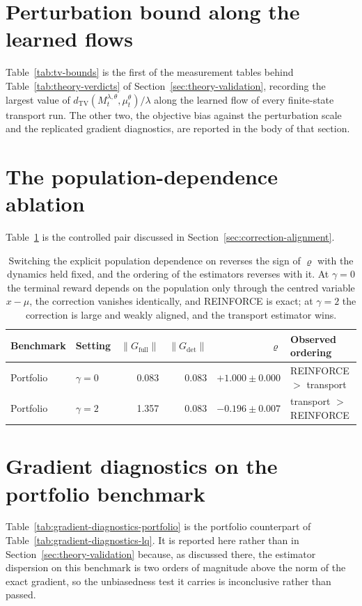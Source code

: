 

\section{Perturbation bound along the learned flows}
\label{appendix:theory-tables}
\label{appendix:tv-bounds}

Table~\ref{tab:tv-bounds} is the first of the measurement tables behind Table~\ref{tab:theory-verdicts} of Section~\ref{sec:theory-validation}, recording the largest value of $d_{\mathrm{TV}}(M_t^{\lambda,\theta},\mu_t^\theta)/\lambda$ along the learned flow of every finite-state transport run. The other two, the objective bias against the perturbation scale and the replicated gradient diagnostics, are reported in the body of that section.



\section{The population-dependence ablation}
\label{appendix:gamma-ablation}

Table~\ref{tab:correction-alignment-ablation} is the controlled pair discussed in Section~\ref{sec:correction-alignment}.

\begin{table}[H]
\centering
\begin{tabular}{llrrrl}
\toprule
Benchmark & Setting & $\|G_{\mathrm{full}}\|$ & $\|G_{\mathrm{det}}\|$ & $\varrho$ & Observed ordering \\
\midrule
Portfolio & $\gamma=0$   & 0.083 & 0.083 & $+1.000\pm0.000$ & REINFORCE $>$ transport \\
Portfolio & $\gamma=2$   & 1.357 & 0.083 & $-0.196\pm0.007$ & transport $>$ REINFORCE \\
\bottomrule
\end{tabular}
\caption{Switching the explicit population dependence on reverses the sign of $\varrho$ with the dynamics held fixed, and the ordering of the estimators reverses with it. At $\gamma=0$ the terminal reward depends on the population only through the centred variable $x-\mu$, the correction vanishes identically, and REINFORCE is exact; at $\gamma=2$ the correction is large and weakly aligned, and the transport estimator wins.}
\label{tab:correction-alignment-ablation}
\end{table}

\section{Gradient diagnostics on the portfolio benchmark}
\label{appendix:portfolio-diagnostics}

Table~\ref{tab:gradient-diagnostics-portfolio} is the portfolio counterpart of Table~\ref{tab:gradient-diagnostics-lq}. It is reported here rather than in Section~\ref{sec:theory-validation} because, as discussed there, the estimator dispersion on this benchmark is two orders of magnitude above the norm of the exact gradient, so the unbiasedness test it carries is inconclusive rather than passed.


